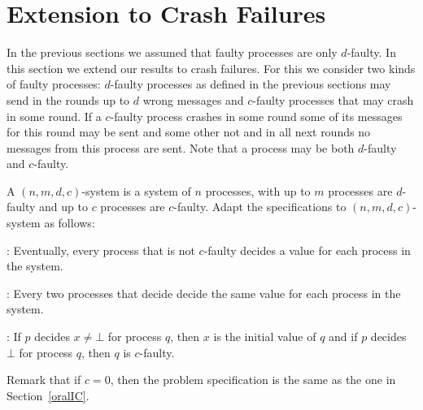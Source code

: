 \section{Extension to Crash Failures}
In the previous sections we assumed that faulty processes are only
$d$-faulty. In this section we extend our results to crash failures.
For this we consider two kinds of faulty processes: $d$-faulty processes as
defined in the previous sections may send in the rounds  up to $d$ wrong messages and
$c$-faulty processes that may crash in some round. If a
$c$-faulty process crashes in some round some of its messages for this round
may be sent and some other not and in all next rounds no messages from
this process are sent. 
Note that a process may be both $d$-faulty and $c$-faulty.

A $( n,m,d,c )$-system is a system of $n$ processes, with up to $m$
processes are $d$-faulty and up to $c$ processes are $c$-faulty.
Adapt the   specifications to $( n,m,d,c)$-system as follows:
  \begin{itemizedot}
    \item {}: Eventually, every process that is not $c$-faulty
     decides a value for each process in the system.
    
    \item {}: Every two processes that decide 
    decide the same value for each process in the system.
    
    \item {}: If $p$ decides $x\neq \bot $ for process $q$, then
           $x$ is the initial value of $q$ and if $p$ decides $\bot$
           for process $q$, then $q$ is $c$-faulty.
  \end{itemizedot}
Remark that if $c=0$, then the problem specification is the same as
the one in Section~\ref{oralIC}.

